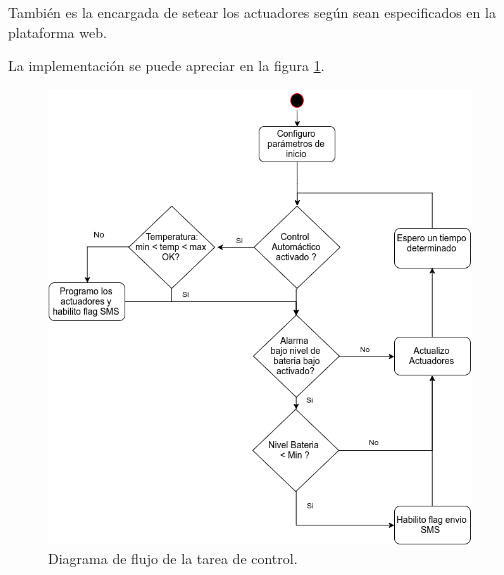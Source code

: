 También es la encargada de setear los actuadores según sean especificados en la plataforma web.

La implementación se puede apreciar en la figura \ref{fig:control_task}.
\begin{figure}[!hp]
  \includegraphics[scale=.5]{./Figures/control_task.png}
  \caption{Diagrama de flujo de la tarea de control.}
  \label{fig:control_task}
\end{figure}

